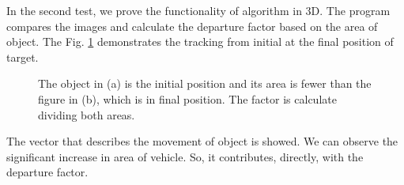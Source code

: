 In the second test, we prove the functionality of algorithm in 3D. 
The program compares the images and calculate the departure factor 
based on the area of object. The Fig. \ref{fig:target} demonstrates the 
tracking from initial at the final position of target.
\begin{figure}[!hbt]
\centering
  \caption{The object in (a) is the initial position and its area is 
  fewer than the figure in (b), which is in final position. 
  The factor is calculate dividing both areas.}
  \label{fig:target}
\end{figure}
The vector that describes the movement of object is showed. 
We can observe the significant increase in area of vehicle. So, it 
contributes, directly, with the departure factor.


